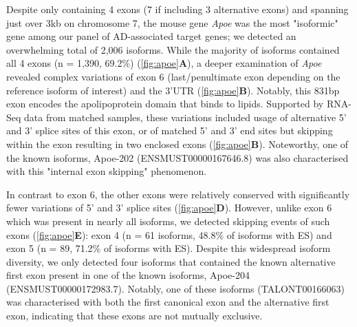 Despite only containing 4 exons (7 if including 3 alternative exons) and spanning just over 3kb on chromosome 7, the mouse gene \textit{Apoe} was the most "isoformic" gene among our panel of AD-associated target genes; we detected an overwhelming total of 2,006 isoforms. While the majority of isoforms contained all 4 exons (n = 1,390, 69.2\%) (\cref{fig:apoe}\textbf{A}), a deeper examination of \textit{Apoe} revealed complex variations of exon 6 (last/penultimate exon depending on the reference isoform of interest) and the 3'UTR (\cref{fig:apoe}\textbf{B}). Notably, this 831bp exon encodes the apolipoprotein domain that binds to lipids.  Supported by RNA-Seq data from matched samples, these variations included usage of alternative 5' and 3' splice sites of this exon, or of matched 5' and 3' end sites but skipping within the exon resulting in two enclosed exons (\cref{fig:apoe}\textbf{B}). Noteworthy, one of the known isoforms, Apoe-202 (ENSMUST00000167646.8) was also characterised with this "internal exon skipping" phenomenon.

In contrast to exon 6, the other exons were relatively conserved with significantly fewer variations of 5' and 3' splice sites (\cref{fig:apoe}\textbf{D}). However, unlike exon 6 which was present in nearly all isoforms, we detected skipping events of such exons (\cref{fig:apoe}\textbf{E}): exon 4 (n = 61 isoforms, 48.8\% of isoforms with ES) and exon 5 (n = 89, 71.2\% of isoforms with ES). Despite this widespread isoform diversity, we only detected four isoforms that contained the known alternative first exon present in one of the known isoforms, Apoe-204 (ENSMUST00000172983.7). Notably, one of these isoforms (TALONT00166063) was characterised with both the first canonical exon and the alternative first exon, indicating that these exons are not mutually exclusive. 

